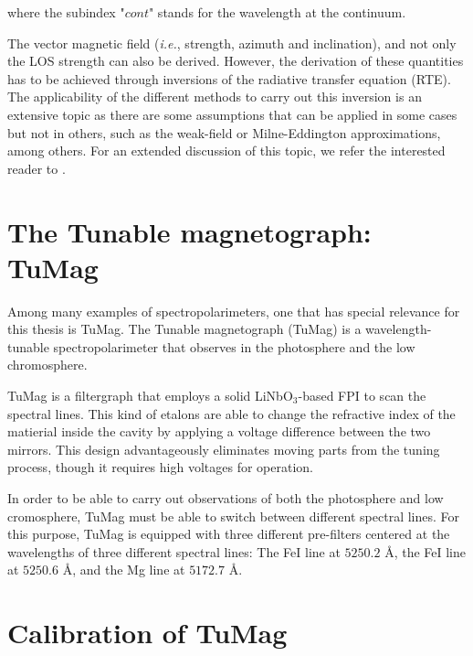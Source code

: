 where the subindex "$cont$" stands for the wavelength at the continuum. 

The vector magnetic field (\textit{i.e.}, strength, azimuth and inclination), and not only the LOS strength can also be derived. However, the derivation of these quantities has to be achieved through inversions of the radiative transfer equation (RTE). The applicability of the different methods to carry out this inversion is an extensive topic as there are some assumptions that can be applied in some cases but not in others, such as the weak-field or Milne-Eddington approximations, among others. For an extended discussion of this topic, we refer the interested reader to \cite{del2016inversion}.   

\section{The Tunable magnetograph: TuMag}

Among many examples of spectropolarimeters, one that has special relevance for this thesis is TuMag. The Tunable magnetograph (TuMag) is a wavelength-tunable spectropolarimeter that observes in the photosphere and the low chromosphere. 

TuMag is a filtergraph that employs a solid LiNbO$_3$-based FPI to scan the spectral lines. This kind of etalons are able to change the refractive index of the matierial inside the cavity by applying a voltage difference between the two mirrors. This design advantageously eliminates moving parts from the tuning process, though it requires high voltages for operation. 

In order to be able to carry out observations of both the photosphere and low cromosphere, TuMag must be able to switch between different spectral lines. For this purpose, TuMag is equipped with three different pre-filters centered at the wavelengths of three different spectral lines: The FeI line at $5250.2$ \r{A}, the FeI line at $5250.6$ \r{A}, and the Mg line at $5172.7$ \r{A}.  


\section{Calibration of TuMag}
